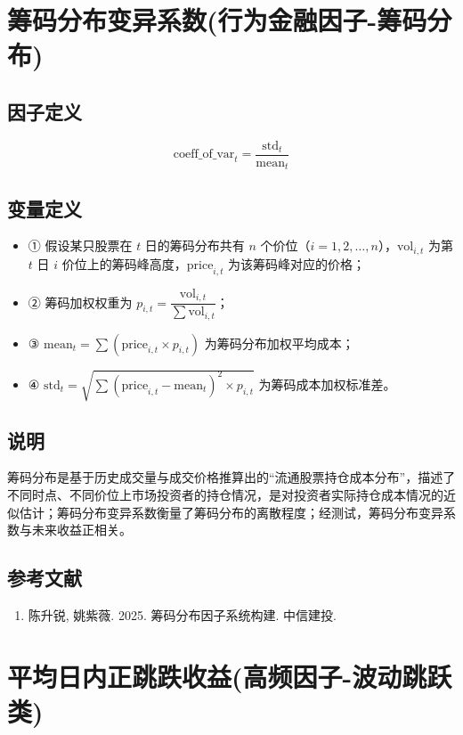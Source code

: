 \documentclass{article}
\begin{document}
\section{筹码分布变异系数(行为金融因子-筹码分布)}

\subsection{因子定义}
\begin{equation}
    \mathrm{coeff\_of\_var}_t = \frac{\mathrm{std}_t}{\mathrm{mean}_t}
\end{equation}

\subsection{变量定义}
\begin{itemize}
    \item ① 假设某只股票在 \( t \) 日的筹码分布共有 \( n \) 个价位（\( i = 1, 2, \ldots, n \)），\( \mathrm{vol}_{i,t} \) 为第 \( t \) 日 \( i \) 价位上的筹码峰高度，\( \mathrm{price}_{i,t} \) 为该筹码峰对应的价格；
    \item ② 筹码加权权重为 \( p_{i,t} = \dfrac{\mathrm{vol}_{i,t}}{\sum \mathrm{vol}_{i,t}} \)；
    \item ③ \( \mathrm{mean}_t = \sum (\mathrm{price}_{i,t} \times p_{i,t}) \) 为筹码分布加权平均成本；
    \item ④ \( \mathrm{std}_t = \sqrt{\sum (\mathrm{price}_{i,t} - \mathrm{mean}_t)^2 \times p_{i,t}} \) 为筹码成本加权标准差。
\end{itemize}

\subsection{说明}
筹码分布是基于历史成交量与成交价格推算出的“流通股票持仓成本分布”，描述了不同时点、不同价位上市场投资者的持仓情况，是对投资者实际持仓成本情况的近似估计；筹码分布变异系数衡量了筹码分布的离散程度；经测试，筹码分布变异系数与未来收益正相关。

\subsection{参考文献}
\begin{enumerate}
    \item 陈升锐, 姚紫薇. 2025. 筹码分布因子系统构建. 中信建投.
\end{enumerate}

\section{平均日内正跳跌收益(高频因子-波动跳跃类)}
\end{document}
